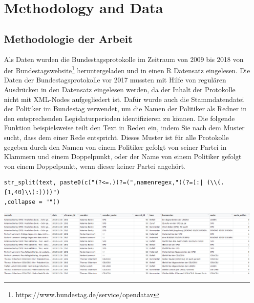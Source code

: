 \section{Methodology and Data}
\subsection{Methodologie der Arbeit}
Als Daten wurden die Bundestagsprotokolle im Zeitraum von 2009 bis 2018 von der Bundestagswebsite\thanks {https://www.bundestag.de/service/opendatav}  heruntergeladen und in einen R Datensatz eingelesen. Die Daten der Bundestagsprotokolle vor 2017 mussten mit Hilfe von regulären Ausdrücken in den Datensatz eingelesen werden, da der Inhalt der Protokolle nicht mit XML-Nodes aufgegliedert ist. Dafür wurde auch die Stammdatendatei der Politiker im Bundestag verwendet, um die Namen der Politiker als Redner in den entsprechenden Legislaturperioden identifizieren zu können. Die folgende Funktion beispielsweise teilt den Text in Reden ein, indem Sie nach dem Muster sucht, dass dem einer Rede entspricht. Dieses Muster ist für alle Protokolle gegeben durch den Namen von einem Politiker gefolgt von seiner Partei in Klammern und einem Doppelpunkt, oder der Name von einem Politiker gefolgt von einem Doppelpunkt, wenn dieser keiner Partei angehört.
\begin{verbatim}
str_split(text, paste0(c("(?<=.)(?=(",namenregex,")(?=(:| (\\(.{1,40}\\):))))")
,collapse = ""))
\end{verbatim}
\includegraphics[width=\linewidth]{Grafiken/Head_Reden.PNG}
\\

